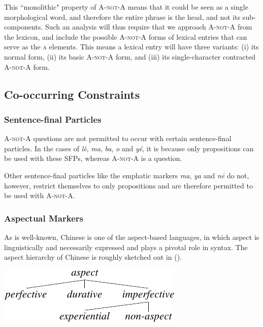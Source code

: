 \documentclass[11pt]{article}
\def\anota{\textsc{A-not-A}}
\newcommand{\myref}[1]{(\getref{#1})}
\begin{document}
This ``monolithic" property of {\anota} means that it could be seen as a
single morphological word, and therefore the entire phrase is the head,
and not its sub-components. Such an analysis will thus require that we
approach {\anota} from the lexicon, and include the possible {\anota}
forms of lexical entries that can serve as the \textsc{a} elements. This
means a lexical entry will have three variants: (i) its normal form,
(ii) its basic {\anota} form, and (iii) its single-character contracted
{\anota} form.




\subsection{Co-occurring Constraints}
\label{ssec:cooccurring}




\subsubsection{Sentence-final Particles}
\label{sssec:sfp}

{\anota} questions are not permitted to occur with certain
sentence-final particles. In the cases of 
\textit{l\`{e}},  \textit{ma}, 
\textit{ba},  \textit{o} and 
\textit{y\'{e}}, it is because only propositions can be used with these
SFPs, whereas {\anota} is a question.


Other sentence-final particles like the emphatic markers
 \textit{ma},  \textit{ya} and
 \textit{n\={e}} do not, however, restrict themselves
to only propositions and are therefore permitted to be used with
{\anota}.


\subsubsection{Aspectual Markers}
\label{sssec:lzg}


As is well-known, Chinese is one of the aspect-based languages, in which
aspect is linguistically and necessarily expressed and plays a pivotal
role in syntax. The aspect hierarchy of Chinese is roughly sketched out
in \myref{fig:aspect}.


{\small 
\ex{}
\vspace{-10pt}
\newline
\includegraphics[scale=.8]{pdf/aspect.pdf}
\xe}
\vspace{-20pt}
\end{document}
